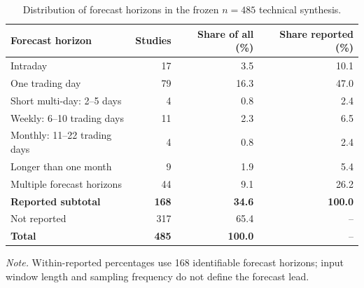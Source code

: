 \documentclass[12pt]{article}
\numberwithin{equation}{section}
\begin{document}
\begin{table}[!htbp]
\centering
\caption{Distribution of forecast horizons in the frozen $n=485$ technical synthesis.}
\label{tab:supp-horizon-distribution}
\small
\setlength{\tabcolsep}{4pt}
\renewcommand{\arraystretch}{1.12}
\begin{tabular}{lrrr}
\toprule
Forecast horizon & Studies & Share of all (\%) & Share reported (\%) \\
\midrule
Intraday & 17 & 3.5 & 10.1 \\
One trading day & 79 & 16.3 & 47.0 \\
Short multi-day: 2--5 days & 4 & 0.8 & 2.4 \\
Weekly: 6--10 trading days & 11 & 2.3 & 6.5 \\
Monthly: 11--22 trading days & 4 & 0.8 & 2.4 \\
Longer than one month & 9 & 1.9 & 5.4 \\
Multiple forecast horizons & 44 & 9.1 & 26.2 \\
\textbf{Reported subtotal} & \textbf{168} & \textbf{34.6} & \textbf{100.0} \\
Not reported & 317 & 65.4 & -- \\
\textbf{Total} & \textbf{485} & \textbf{100.0} & -- \\
\bottomrule
\end{tabular}

\vspace{1mm}
\begin{minipage}{0.97\linewidth}
\footnotesize
\textit{Note.} Within-reported percentages use 168 identifiable forecast horizons; input window length and sampling frequency do not define the forecast lead.
\end{minipage}
\end{table}

\FloatBarrier
\end{document}
